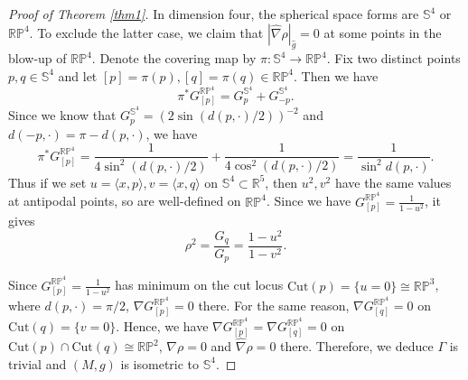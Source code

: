\documentclass[10pt,a4paper]{amsart}
\newcommand{\R}{\mathbb{R}}
\newcommand{\RP}{\mathbb{RP}}
\renewcommand{\S}{\mathbb{S}}
\newcommand{\hg}{\widehat{g}}
\newcommand{\hn}{\widehat{\nabla}}
\begin{document}
\begin{proof}[Proof of Theorem \ref{thm1}]
In dimension four, the spherical space forms are $\S^4$ or $\mathbb{RP}^4$. To exclude the latter case, we claim that $|\hn\rho|_{\hg}=0$ at some points in the blow-up of $\mathbb{RP}^4$. Denote the covering map by $\pi:\S^4\rightarrow\mathbb{RP}^4$. Fix two distinct points $p,q\in\S^4$ and let $[p]=\pi(p),[q]=\pi(q)\in\RP^4$. Then we have
\begin{equation*}
\pi^\ast G_{[p]}^{\RP^4}=G_{p}^{\S^4}+G_{-p}^{\S^4}.
\end{equation*}
Since we know that $G^{\S^4}_p=(2\sin(d(p,\cdot)/2))^{-2}$ and $d(-p,\cdot)=\pi-d(p,\cdot)$, we have
\begin{equation*}
\pi^\ast G_{[p]}^{\RP^4}=\frac{1}{4\sin^2(d(p,\cdot)/2)}+\frac{1}{4\cos^2(d(p,\cdot)/2)}=\frac{1}{\sin^2d(p,\cdot)}.
\end{equation*}
Thus if we set $u=\langle x,p\rangle, v=\langle x,q\rangle$ on $\S^4\subset\R^5$, then $u^2,v^2$ have the same values at antipodal points, so are well-defined on $\RP^4$. Since we have $G_{[p]}^{\RP^4}=\frac{1}{1-u^2}$, it gives
\begin{equation*}
\rho^2=\frac{G_q}{G_p}=\frac{1-u^2}{1-v^2}.
\end{equation*}

Since $G_{[p]}^{\RP^4}=\frac{1}{1-u^2}$ has minimum on the cut locus $\mathrm{Cut}(p)=\{u=0\}\cong\RP^3$, where $d(p,\cdot)=\pi/2$, $\nabla G_{[p]}^{\RP^4}=0$ there. For the same reason, $\nabla G_{[q]}^{\RP^4}=0$ on $\mathrm{Cut}(q)=\{v=0\}$. Hence, we have $\nabla G_{[p]}^{\RP^4}=\nabla G_{[q]}^{\RP^4}=0$ on $\mathrm{Cut}(p)\cap\mathrm{Cut}(q)\cong\RP^2$, $\nabla\rho=0$ and $\hn\rho=0$ there. Therefore, we deduce $\Gamma$ is trivial and $(M,g)$ is isometric to $\S^4$.  
\end{proof}
\end{document}
